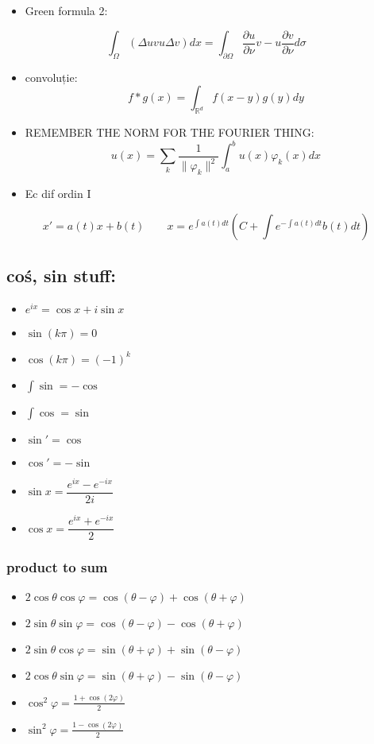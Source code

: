 \documentclass[11pt]{article}
\newcommand{\R}{\mathbb{R}} \newcommand{\C}{\mathbb{C}}
\renewcommand{\phi}{\varphi} \newcommand{\parti}[2]{\frac{\partial #1}{\partial #2}}
\begin{document}
\begin{itemize}
\item Green formula 2:
\end{itemize}
\[ \int_\Omega (\Delta u v u\Delta v) dx = \int_{\partial \Omega} \parti{u}{\nu} v - u \parti{v}{\nu}  d \sigma \]
\begin{itemize}
\item convoluție:
\[ f*g (x) = \int_{\R^d} f(x-y) g(y)dy \]
\item REMEMBER THE NORM FOR THE FOURIER THING:
\[ u(x) = \sum_k \frac{1}{\|\phi_k\|^2} \int_a^b u(x) \phi_k(x) dx \]
\item Ec dif ordin I
\end{itemize}
\[x' = a(t)x + b(t) \quad \quad x = e^{\int a(t)dt} \left( C + \int e^{-\int a(t) dt} b(t) dt \right)\]
\subsection*{coś, sin stuff:}
\label{sec:org96544bc}
\begin{itemize}
\item \(e^{ix} = \cos x + i \sin x\)
\item \(\sin (k \pi) = 0\)
\item \(\cos (k \pi) = (-1)^k\)
\item \(\int \sin = - \cos\)
\item \(\int \cos = \sin\)
\item \(\sin' = \cos\)
\item \(\cos' = - \sin\)
\item \(\sin x = \dfrac{e^{ix}-e^{-ix}}{2i}\)
\item \(\cos x = \dfrac{e^{ix}+e^{-ix}}{2}\)
\end{itemize}
\subsubsection*{product to sum}
\label{sec:org04d6dff}
\begin{itemize}
\item \(2\cos \theta \cos \varphi = {{\cos(\theta - \varphi) + \cos(\theta + \varphi)}}\)
\item \(2\sin \theta \sin \varphi = {{\cos(\theta - \varphi) - \cos(\theta + \varphi)} }\)
\item \(2\sin \theta \cos \varphi = {{\sin(\theta + \varphi) + \sin(\theta - \varphi)} }\)
\item \(2\cos \theta \sin \varphi = {{\sin(\theta + \varphi) - \sin(\theta - \varphi)} }\)
\item \(\cos^2 \varphi = \frac{1+\cos(2\varphi)}{2}\)
\item \(\sin^2 \varphi = \frac{1-\cos(2\varphi)}{2}\)
\end{itemize}
\end{document}
